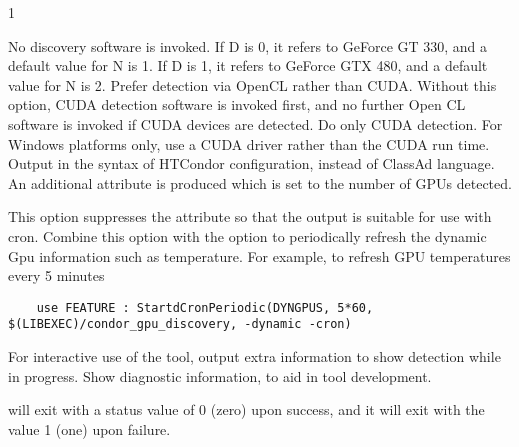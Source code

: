\begin{ManPage}{\label{man-condor-gpu-discovery}}{1}
\begin{Options}
{    No discovery software is invoked.
    If D is 0, it refers to GeForce GT 330, and a default value for N is 1.
    If D is 1, it refers to GeForce GTX 480, and a default value for N is 2.
  }
   {
    Prefer detection via OpenCL rather than CUDA.
    Without this option, CUDA detection software is invoked first,
    and no further Open CL software is invoked if CUDA devices are detected.
  }
   {
    Do only CUDA detection.
  }
   {
    For Windows platforms only, use a CUDA driver rather than the
    CUDA run time.
  }
   {
    Output in the syntax of 
    HTCondor configuration, instead of ClassAd language.
    An additional attribute is produced  which
    is set to the number of GPUs detected.
  }
   {
    This option suppresses the  attribute so that the output
    is suitable for use with  cron.
    Combine this option with the  option to periodically refresh the dynamic
    Gpu information such as temperature. For example, to refresh GPU temperatures every 5 minutes
    \begin{verbatim}
    use FEATURE : StartdCronPeriodic(DYNGPUS, 5*60, $(LIBEXEC)/condor_gpu_discovery, -dynamic -cron)
    \end{verbatim}
  }
   {
    For interactive use of the tool, output extra information to show 
    detection while in progress.
  }
   {
    Show diagnostic information, to aid in tool development.
  }
\end{Options}

\ExitStatus

 will exit with a status value of 0 (zero) upon success,
and it will exit with the value 1 (one) upon failure.


\end{ManPage}
